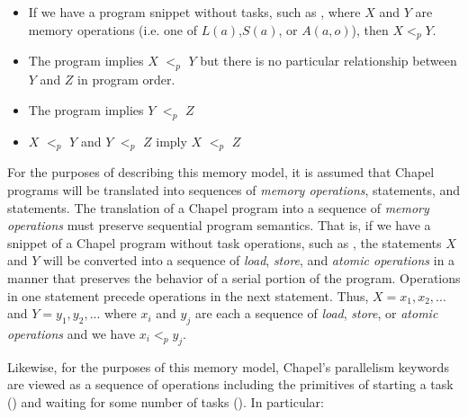 \begin{itemize}

  \item If we have a program snippet without tasks, such as , where
$X$ and $Y$ are memory operations (i.e. one of $L(a)$,$S(a)$, or $A(a,o)$), then
$X <_p Y$.

  \item The program  implies $X$ $<_p$ $Y$ but there is
no particular relationship between $Y$ and $Z$ in program order.

  \item The program  implies $Y$ $<_p$ $Z$
  \item $X$ $<_p$ $Y$ and $Y$ $<_p$ $Z$ imply $X$ $<_p$ $Z$
\end{itemize}

For the purposes of describing this memory model, it is assumed that Chapel
programs will be translated into sequences of \textit{memory operations},
 statements, and  statements. The translation of a
Chapel program into a sequence of \textit{memory operations} must preserve
sequential program semantics. That is, if we have a snippet of a Chapel program
without task operations, such as , the statements $X$ and $Y$ will
be converted into a sequence of \textit{load}, \textit{store}, and
\textit{atomic operations} in a manner that preserves the behavior of a serial
portion of the program. Operations in one statement precede operations in the
next statement.  Thus, $X=x_1,x_2,...$ and $Y=y_1,y_2,...$ where $x_i$ and
$y_j$ are each a sequence of \textit{load}, \textit{store}, or \textit{atomic
operations} and we have $x_i <_p y_j$.

Likewise, for the purposes of this memory model, Chapel's parallelism keywords
are viewed as a sequence of operations including the primitives of starting a
task () and waiting for some number of tasks
(). In particular:

